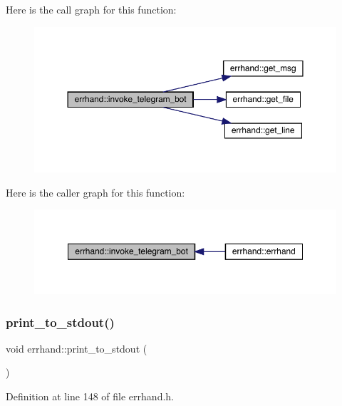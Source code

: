 Here is the call graph for this function\+:\nopagebreak
\begin{figure}[H]
\begin{center}
\leavevmode
\includegraphics[width=350pt]{classerrhand_adbc86e81b391a68d2bf9a13529c977d3_cgraph}
\end{center}
\end{figure}
Here is the caller graph for this function\+:\nopagebreak
\begin{figure}[H]
\begin{center}
\leavevmode
\includegraphics[width=350pt]{classerrhand_adbc86e81b391a68d2bf9a13529c977d3_icgraph}
\end{center}
\end{figure}
\mbox{\label{classerrhand_a5b4d8a74f1d0c6842526dc8b54e38dc2}} 
\subsubsection{\texorpdfstring{print\+\_\+to\+\_\+stdout()}{print\_to\_stdout()}}
{\footnotesize\ttfamily void errhand\+::print\+\_\+to\+\_\+stdout (\begin{DoxyParamCaption}{ }\end{DoxyParamCaption})\hspace{0.3cm}{\ttfamily [inline]}}



Definition at line 148 of file errhand.\+h.

